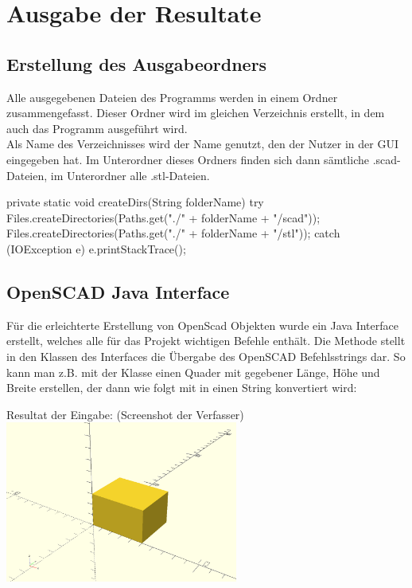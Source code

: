 \section{Ausgabe der Resultate}
\subsection{Erstellung des Ausgabeordners}
Alle ausgegebenen Dateien des Programms werden in einem Ordner zusammengefasst.
Dieser Ordner wird im gleichen Verzeichnis erstellt, in dem auch das Programm ausgeführt wird. \\
Als Name des Verzeichnisses wird der Name genutzt, den der Nutzer in der GUI eingegeben hat.
Im Unterordner  dieses Ordners finden sich dann sämtliche .scad-Dateien, im Unterordner  alle .stl-Dateien.
 
\begin{code}
	private static void createDirs(String folderName) {
		try {
			Files.createDirectories(Paths.get("./" + folderName + "/scad"));
			Files.createDirectories(Paths.get("./" + folderName + "/stl"));
		} catch (IOException e) {
			e.printStackTrace();
		}
	}
\end{code}

\subsection{OpenSCAD Java Interface}
Für die erleichterte Erstellung von OpenScad Objekten wurde ein Java Interface  erstellt, welches alle für das Projekt wichtigen Befehle enthält.
Die Methode  stellt in den Klassen des Interfaces die Übergabe des OpenSCAD Befehlsstrings dar.
So kann man z.B. mit der Klasse  einen Quader mit gegebener Länge, Höhe und Breite erstellen, der dann wie folgt mit  in einen String konvertiert wird:
\\

\begin{Bild}{Resultat der Eingabe:  (Screenshot der Verfasser)}
	\includegraphics[height = 200px]{Bilder/Quader}
\end{Bild}


